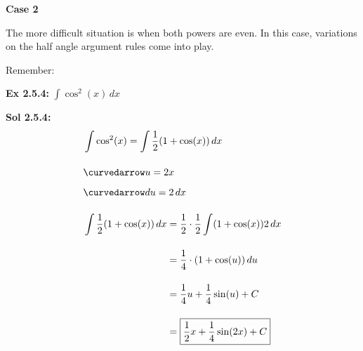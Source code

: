 \vspace{11pt}

\textbf{Case 2} \par

The more difficult situation is when both powers are even. In this case, variations on the half angle argument rules come into play. \par

Remember: \par


\begin{tcolorbox}[example]
    \textbf{Ex 2.5.4: } $\int \cos^2 (x) \, dx$
\end{tcolorbox}
\begin{tcolorbox}[solution]
    \textbf{Sol 2.5.4: } \begin{align*}
        & \int \cos^2 (x) = \int \dfrac{1}{2}(1 + \cos (x)) \, dx \\[11pt]
        & \curvedarrow u = 2x \\[5.5pt]
        & \curvedarrow du = 2 \, dx \\[11pt]
        & \int \dfrac{1}{2}(1 + \cos (x)) \, dx \begin{aligned}[t]
            & = \dfrac{1}{2} \cdot \dfrac{1}{2}\int (1 + \cos (x)) 2 \, dx \\[11pt]
            & = \dfrac{1}{4} \cdot (1 + \cos (u)) \, du \\[11pt]
            & = \dfrac{1}{4}u + \dfrac{1}{4}\sin (u) + C \\[11pt]
            & = \boxed{\dfrac{1}{2}x + \dfrac{1}{4}\sin (2x) + C}
        \end{aligned}
    \end{align*}
\end{tcolorbox}

